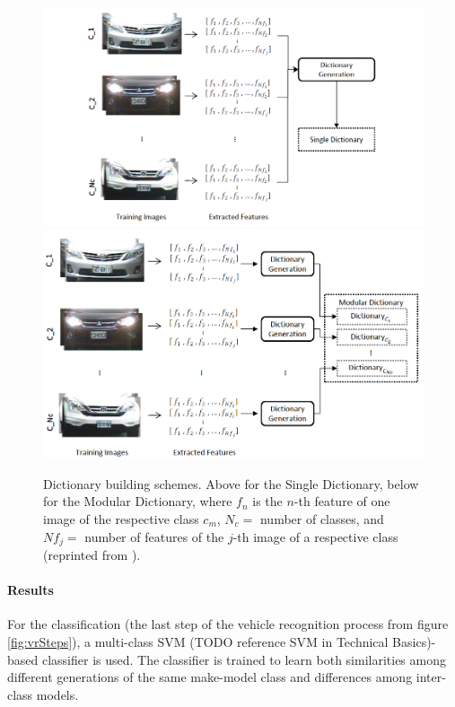 \begin{figure}[bth]
  \centering
        \includegraphics[width=.95\linewidth]{gfx/single_dictionary_reprint}
        \includegraphics[width=.95\linewidth]{gfx/modular_dictionary_reprint}
        \caption{Dictionary building schemes. Above for the Single Dictionary, below for the Modular Dictionary, where $f_n$ is the $n$-th feature of one image of the respective class $c_m$, $N_c = $ number of classes, and $Nf_j = $ number of features of the $j$-th image of a respective class (reprinted from \citep{siddiqui2015robust}).}
        \label{fig:dictionarySDMD}
\end{figure}

\paragraph{Results}
For the classification (the last step of the vehicle recognition process from figure \ref{fig:vrSteps}), a multi-class SVM (TODO reference SVM in Technical Basics)-based classifier is used. The classifier is trained to learn both similarities among different generations of the same make-model class and differences among inter-class models.

